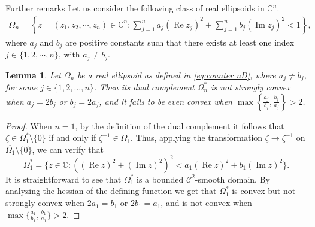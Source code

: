 \documentclass[11pt, oneside, reqno]{amsart}
\numberwithin{equation}{section}
\newtheorem{lemma}[theorem]{Lemma}
\theoremstyle{definition}
\newcommand{\bea} {\begin{eqnarray}}
\newcommand{\eea} {\end{eqnarray}}
\newcommand{\cont}{\mathcal C}
\newcommand{\C}{\mathbb C}
\newcommand{\Ima}{\operatorname{Im}}
\newcommand{\rea}{\operatorname{Re}}
\newcommand{\Om}{\Omega}
\begin{document}
{\begin{section}{Further remarks}
 Let us consider the following class of real ellipsoids in $\C^n$.
\bea\label{eq:counter nD}
\Om_n=\left\{z=(z_1,z_2,\cdots,z_n)\in\C^n: \sum_{j=1}^n a_j(\operatorname{Re}z_j)^2 +\sum_{j=1}^n b_j(\operatorname{Im}z_j)^2<1\right\},
\eea
where $a_j$ and $b_j$ are positive constants such that there exists at least one index $j\in\{1,2,\cdots,n\}$, with $a_j\neq b_j$.
 \begin{lemma}\label{le:counter ellip}
 Let $\Om_n$ be a real ellipsoid as defined in \eqref{eq:counter nD}, where $a_j \neq b_j$, for some $j \in \{1, 2, \dots, n\}$. Then its dual complement $\Om_n^*$ is not strongly convex when $a_j = 2b_j$ or $b_j = 2a_j$, and it fails to be even convex when $\max\left\{\frac{a_j}{b_j}, \frac{b_j}{a_j}\right\}>2$.  
 \end{lemma}
 \begin{proof}
When $n=1$, by the definition of the dual complement it follows that
 $\zeta\in \Om_1^*\setminus\{0\}$ if and only if $\zeta^{-1}\in \overline{\Om_1}$. Thus, applying  the transformation $\zeta\rightarrow \zeta^{-1}$ on $\overline{\Om_1}\setminus\{0\}$, we can verify that
\[
\Om_1^*=\{z\in\C: ((\rea z)^2+(\Ima z)^2)^2< a_1(\rea z)^2+b_1(\Ima z)^2\}.
\]
    It is straightforward to see that $\Om_1^*$ is a bounded $\cont^2$-smooth domain. By analyzing the hessian of the defining function we get that $\Om_1^*$ is convex but not strongly convex when $2a_1=b_1$ or $2b_1=a_1$, and is not convex when $\max\{\frac{a_1}{b_1},\frac{b_1}{a_1}\}> 2$.


\end{proof}
\end{section}}
\end{document}
